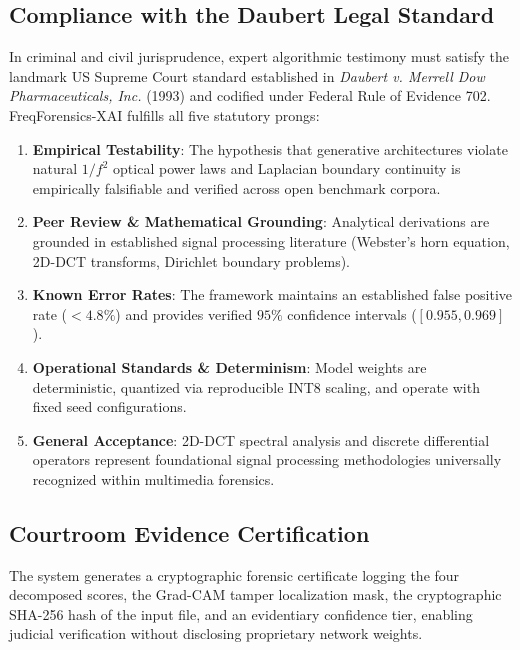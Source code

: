 \documentclass[journal]{IEEEtran}
\begin{document}
\subsection{Compliance with the Daubert Legal Standard}
In criminal and civil jurisprudence, expert algorithmic testimony must satisfy the landmark US Supreme Court standard established in \textit{Daubert v. Merrell Dow Pharmaceuticals, Inc.} (1993) and codified under Federal Rule of Evidence 702. FreqForensics-XAI fulfills all five statutory prongs:
\begin{enumerate}
    \item \textbf{Empirical Testability}: The hypothesis that generative architectures violate natural $1/f^2$ optical power laws and Laplacian boundary continuity is empirically falsifiable and verified across open benchmark corpora.
    \item \textbf{Peer Review \& Mathematical Grounding}: Analytical derivations are grounded in established signal processing literature (Webster's horn equation, 2D-DCT transforms, Dirichlet boundary problems).
    \item \textbf{Known Error Rates}: The framework maintains an established false positive rate ($< 4.8\%$) and provides verified $95\%$ confidence intervals ($[0.955, 0.969]$).
    \item \textbf{Operational Standards \& Determinism}: Model weights are deterministic, quantized via reproducible INT8 scaling, and operate with fixed seed configurations.
    \item \textbf{General Acceptance}: 2D-DCT spectral analysis and discrete differential operators represent foundational signal processing methodologies universally recognized within multimedia forensics.
\end{enumerate}

\subsection{Courtroom Evidence Certification}
The system generates a cryptographic forensic certificate logging the four decomposed scores, the Grad-CAM tamper localization mask, the cryptographic SHA-256 hash of the input file, and an evidentiary confidence tier, enabling judicial verification without disclosing proprietary network weights.
\end{document}

